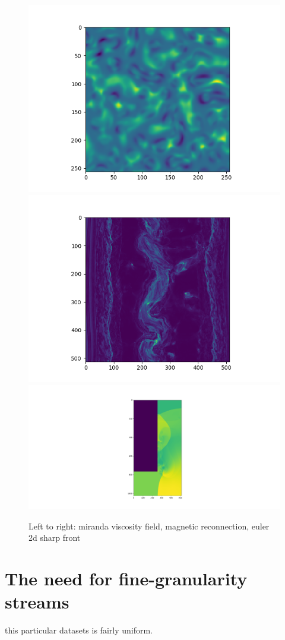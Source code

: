 \begin{figure}[!htb]
        \includegraphics[width=0.33\linewidth]{img/dataset/miranda-viscosity.png}
        \includegraphics[width=0.33\linewidth]{img/dataset/magnetic.png}
        \includegraphics[width=0.33\linewidth]{img/dataset/euler2d.png}
        \caption{Left to right: miranda viscosity field, magnetic reconnection, euler 2d sharp front}
        \label{fig:datasets}
\end{figure}

\section{The need for fine-granularity streams}
%
%
this particular datasets is fairly uniform.

